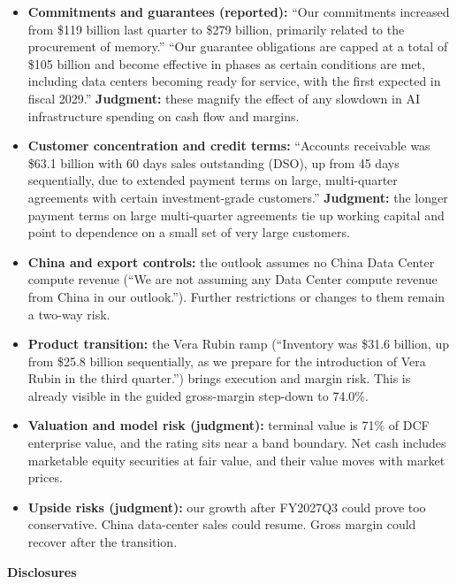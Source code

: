 \documentclass[a4paper,10pt]{article}
\begin{document}
\begin{itemize}\setlength{\itemsep}{1pt}
\item \textbf{Commitments and guarantees (reported):} “Our commitments increased from \$119 billion last quarter to \$279 billion, primarily related to the procurement of memory.” “Our guarantee obligations are capped at a total of \$105 billion and become effective in phases as certain conditions are met, including data centers becoming ready for service, with the first expected in fiscal 2029.” \textbf{Judgment:} these magnify the effect of any slowdown in AI infrastructure spending on cash flow and margins.
\item \textbf{Customer concentration and credit terms:} “Accounts receivable was \$63.1 billion with 60 days sales outstanding (DSO), up from 45 days sequentially, due to extended payment terms on large, multi-quarter agreements with certain investment-grade customers.” \textbf{Judgment:} the longer payment terms on large multi-quarter agreements tie up working capital and point to dependence on a small set of very large customers.
\item \textbf{China and export controls:} the outlook assumes no China Data Center compute revenue (“We are not assuming any Data Center compute revenue from China in our outlook.”). Further restrictions or changes to them remain a two-way risk.
\item \textbf{Product transition:} the Vera Rubin ramp (“Inventory was \$31.6 billion, up from \$25.8 billion sequentially, as we prepare for the introduction of Vera Rubin in the third quarter.”) brings execution and margin risk. This is already visible in the guided gross-margin step-down to 74.0\%.
\item \textbf{Valuation and model risk (judgment):} terminal value is 71\% of DCF enterprise value, and the rating sits near a band boundary. Net cash includes marketable equity securities at fair value, and their value moves with market prices.
\item \textbf{Upside risks (judgment):} our growth after FY2027Q3 could prove too conservative. China data-center sales could resume. Gross margin could recover after the transition.
\end{itemize}

\par\smallskip\textbf{\color{MemoBlue}Disclosures}\par
\end{document}
